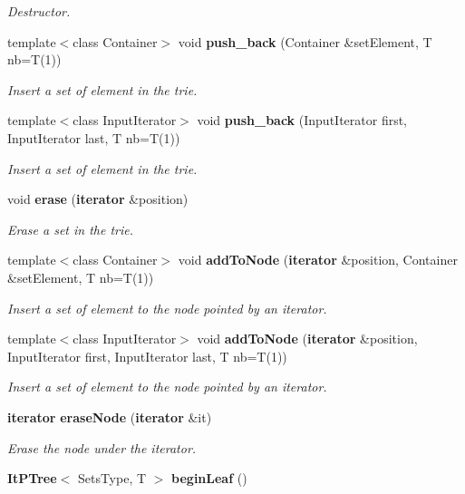 \begin{CompactItemize}
\begin{CompactList}\small\item\em Destructor. \item\end{CompactList}\item 
template$<$class Container$>$ void {\bf push\_\-back} (Container \&set\-Element, T nb=T(1))
\begin{CompactList}\small\item\em Insert a set of element in the trie. \item\end{CompactList}\item 
template$<$class Input\-Iterator$>$ void {\bf push\_\-back} (Input\-Iterator first, Input\-Iterator last, T nb=T(1))
\begin{CompactList}\small\item\em Insert a set of element in the trie. \item\end{CompactList}\item 
void {\bf erase} ({\bf iterator} \&position)
\begin{CompactList}\small\item\em Erase a set in the trie. \item\end{CompactList}\item 
template$<$class Container$>$ void {\bf add\-To\-Node} ({\bf iterator} \&position, Container \&set\-Element, T nb=T(1))
\begin{CompactList}\small\item\em Insert a set of element to the node pointed by an iterator. \item\end{CompactList}\item 
template$<$class Input\-Iterator$>$ void {\bf add\-To\-Node} ({\bf iterator} \&position, Input\-Iterator first, Input\-Iterator last, T nb=T(1))
\begin{CompactList}\small\item\em Insert a set of element to the node pointed by an iterator. \item\end{CompactList}\item 
{\bf iterator} {\bf erase\-Node} ({\bf iterator} \&it)
\begin{CompactList}\small\item\em Erase the node under the iterator. \item\end{CompactList}\item 
{\bf It\-PTree}$<$ Sets\-Type, T $>$ {\bf begin\-Leaf} ()\label{class_p_tree_9be852a43758de579be2642e5dc82334}


\end{CompactItemize}
